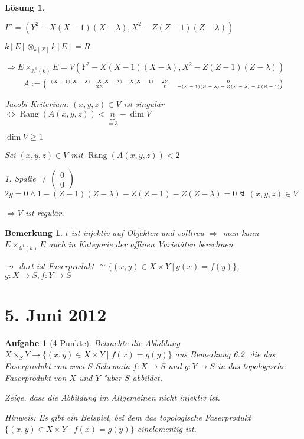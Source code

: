 \documentclass[paper = A4, fontsize=12pt, numbers=noendperiod, chapterprefix=true]{scrbook}
\theoremstyle{break}
\newtheorem{Aufg}{Aufgabe}
\newtheorem{Loes}{L\"osung}
\theoremstyle{nonumberbreak}
\newtheorem{bem}{Bemerkung}
\theoremstyle{nonumberplain}
\DeclareMathOperator{\Rang}{Rang}
\newcommand{\A}{\mathbb{A}}
\newcommand{\X}{\times}
\begin{document}
\begin{Loes}
\begin{enumerate}[a)]
\begin{center}
\end{center}
	$I'' = (Y^2 - X(X-1)(X-\lambda), X^2 - Z(Z-1)(Z-\lambda))$
	
	$k[E] \otimes_{k[X]} k[E] = R$
	
	$\Rightarrow E \X_{\A^1(k)} E = V(Y^2 - X(X-1)(X-\lambda), X^2 - Z(Z-1)(Z-\lambda))$
		\[ A := \tiny\begin{pmatrix} -(X-1)(X-\lambda) - X(X-\lambda) - X(X-1) & 2Y & 0\\
		2X & 0 & -(Z-1)(Z-\lambda) - Z(Z-\lambda) - Z(Z-1)\normalsize\end{pmatrix} \]
		
	\emph{Jacobi-Kriterium:} $(x,y,z) \in V$ ist singul\"ar $\Leftrightarrow \Rang(A(x,y,z)) < \underbrace{n}_{=3} - \dim V$
	
	$\dim V \ge 1$
	
	Sei $(x,y,z) \in V$ mit $\Rang(A(x,y,z)) < 2$
	
	1. Spalte $\ne \begin{pmatrix}0\\0\end{pmatrix}$\\
	$2y = 0 \wedge 1 - (Z-1)(Z-\lambda) - Z(Z-1) - Z(Z-\lambda) = 0 \lightning (x,y,z) \in V$
	
	$\Rightarrow V$ ist regul\"ar.
\end{enumerate}\end{Loes}

\begin{bem}
$t$ ist injektiv auf Objekten und volltreu $\Rightarrow$ man kann $E \X_{\A^1(k)} E$ auch in Kategorie der affinen Variet\"aten berechnen

$\leadsto$ dort ist Faserprodukt $\cong \{ (x,y) \in X \X Y \ |\ g(x) = f(y)\}$, $g: X \to S, f: Y \to S$
\end{bem}


\newpage
\section{5. Juni 2012}
\setcounter{Aufg}{0}
\setcounter{Loes}{0}

\begin{Aufg}[4 Punkte]
Betrachte die Abbildung $X \times_S Y \to \{(x,y) \in X \times Y \mid f(x) = g(y) \}$ aus Bemerkung 6.2, die das Faserprodukt von zwei $S$-Schemata $f \colon X \to S$ und $g \colon Y \to S$ in das topologische Faserprodukt von $X$ und $Y$ "uber $S$ abbildet.

Zeige, dass die Abbildung im Allgemeinen nicht injektiv ist.

\textit{Hinweis: Es gibt ein Beispiel, bei dem das topologische Faserprodukt $\{(x,y) \in X \times Y \mid f(x) = g(y)\}$ einelementig ist.}
\end{Aufg}
\end{document}
